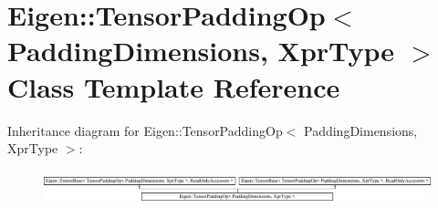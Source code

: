 \hypertarget{class_eigen_1_1_tensor_padding_op}{}\section{Eigen\+:\+:Tensor\+Padding\+Op$<$ Padding\+Dimensions, Xpr\+Type $>$ Class Template Reference}
\label{class_eigen_1_1_tensor_padding_op}
Inheritance diagram for Eigen\+:\+:Tensor\+Padding\+Op$<$ Padding\+Dimensions, Xpr\+Type $>$\+:\begin{figure}[H]
\begin{center}
\leavevmode
\includegraphics[height=0.985915cm]{class_eigen_1_1_tensor_padding_op}
\end{center}
\end{figure}
